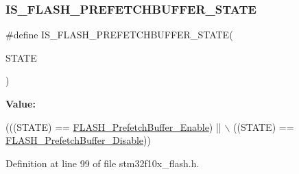 \subsubsection{\texorpdfstring{I\+S\+\_\+\+F\+L\+A\+S\+H\+\_\+\+P\+R\+E\+F\+E\+T\+C\+H\+B\+U\+F\+F\+E\+R\+\_\+\+S\+T\+A\+TE}{IS\_FLASH\_PREFETCHBUFFER\_STATE}}
{\footnotesize\ttfamily \#define I\+S\+\_\+\+F\+L\+A\+S\+H\+\_\+\+P\+R\+E\+F\+E\+T\+C\+H\+B\+U\+F\+F\+E\+R\+\_\+\+S\+T\+A\+TE(\begin{DoxyParamCaption}\item[{}]{S\+T\+A\+TE }\end{DoxyParamCaption})}

{\bfseries Value\+:}
\begin{DoxyCode}
(((STATE) == \hyperlink{group___prefetch___buffer___enable___disable_gad0fac43d078a77794f22840f326a6ed9}{FLASH\_PrefetchBuffer\_Enable}) || \(\backslash\)
                                              ((STATE) == 
      \hyperlink{group___prefetch___buffer___enable___disable_ga2feb631ad85449f83517f05aaf4ba26c}{FLASH\_PrefetchBuffer\_Disable}))
\end{DoxyCode}


Definition at line 99 of file stm32f10x\+\_\+flash.\+h.

